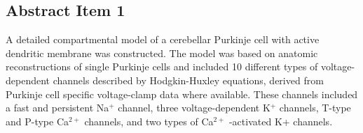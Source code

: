\documentclass[12pt]{article}
\begin{document}
\subsection*{Abstract Item 1}

A detailed compartmental model of a cerebellar Purkinje
cell with active dendritic membrane was constructed. The model
was based on anatomic reconstructions of single Purkinje cells and
included 10 different types of voltage-dependent channels described
by Hodgkin-Huxley equations, derived from Purkinje cell specific
voltage-clamp data where available. These channels included
a fast and persistent Na$^+$ channel, three voltage-dependent
K$^+$ channels, T-type and P-type Ca$^{2+}$ channels, and two types of
Ca$^{2+}$ -activated K+ channels.
\end{document}
